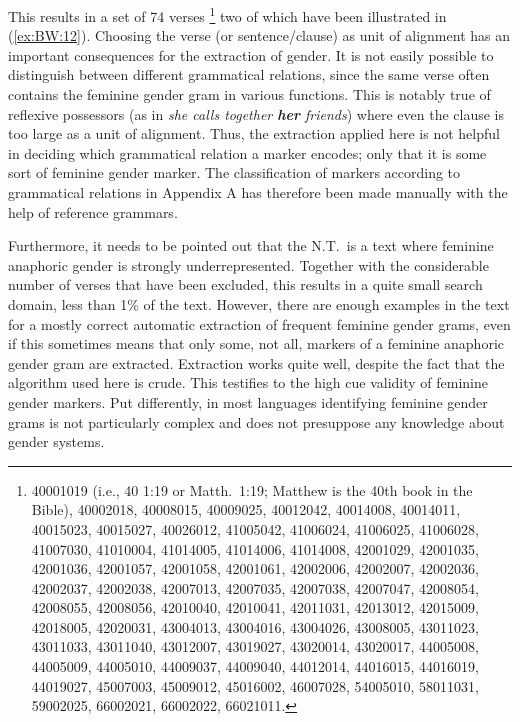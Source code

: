 \documentclass[output=collectionpaper]{langsci/langscibook}
\begin{document}
This results in a set of 74 verses%
\footnote{%
40001019 (i.e., 40 1:19 or Matth.\ 1:19; Matthew is the 40th book in the Bible), 40002018, 40008015, 40009025, 40012042, 40014008, 40014011, 40015023, 40015027, 40026012, 41005042, 41006024, 41006025, 41006028, 41007030, 41010004, 41014005, 41014006, 41014008, 42001029, 42001035, 42001036, 42001057, 42001058, 42001061, 42002006, 42002007, 42002036, 42002037, 42002038, 42007013, 42007035, 42007038, 42007047, 42008054, 42008055, 42008056, 42010040, 42010041, 42011031, 42013012, 42015009, 42018005, 42020031, 43004013, 43004016, 43004026, 43008005, 43011023, 43011033, 43011040, 43012007, 43019027, 43020014, 43020017, 44005008, 44005009, 44005010, 44009037, 44009040, 44012014, 44016015, 44016019, 44019027, 45007003, 45009012, 45016002, 46007028, 54005010, 58011031, 59002025, 66002021, 66002022, 66021011.
} %
two of which have been illustrated in (\ref{ex:BW:12}). Choosing the verse (or sentence/clause) as unit of alignment has an important consequences for the extraction of gender. It is not easily possible to distinguish between different grammatical relations, since the same verse often contains the feminine gender gram in various functions. This is notably true of reflexive possessors (as in \textit{she calls together \textbf{her} friends}) where even the clause is too large as a unit of alignment. Thus, the extraction applied here is not helpful in deciding which grammatical relation a marker encodes; only that it is some sort of feminine gender marker. The classification of markers according to grammatical relations in Appendix A has therefore been made manually with the help of reference grammars.

Furthermore, it needs to be pointed out that the N.T.\ is a text where feminine anaphoric gender is strongly underrepresented. Together with the considerable number of verses that have been excluded, this results in a quite small search domain, less than 1\% of the text. However, there are enough examples in the text for a mostly correct automatic extraction of frequent feminine gender grams, even if this sometimes means that only some, not all, markers of a feminine anaphoric gender gram are extracted. Extraction works quite well, despite the fact that the algorithm used here is crude. This testifies to the high cue validity of feminine gender markers. Put differently, in most languages identifying feminine gender grams is not particularly complex and does not presuppose any knowledge about gender systems.
\end{document}
